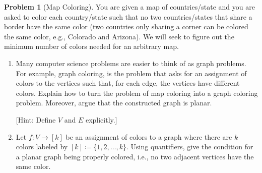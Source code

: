\documentclass{article}
\theoremstyle{plain}
\theoremstyle{definition}
\newtheorem{problem}{Problem}
\newcommand{\ra}{\rightarrow}
\begin{document}
\begin{problem}[Map Coloring]
    You are given a map of countries/state and you are asked to color each country/state such that no two countries/states that share a border have the same color (two countries only sharing a corner can be colored the same color, e.g., Colorado and Arizona). We will seek to figure out the minimum number of colors needed for an arbitrary map.
    
    \begin{enumerate}
        \item Many computer science problems are easier to think of as graph problems. For example, graph coloring, is the problem that asks for an assignment of colors to the vertices such that, for each edge, the vertices have different colors. Explain how to turn the problem of map coloring into a graph coloring problem. Moreover, argue that the constructed graph is planar.

        [Hint: Define \(V\) and \(E\) explicitly.]


        \item Let \(f: V \ra [k]\) be an assignment of colors to a graph where there are \(k\) colors labeled by \([k] \coloneq \{1, 2, \dotsc, k\}\). Using quantifiers, give the condition for a planar graph being properly colored, i.e., no two adjacent vertices have the same color.


\end{enumerate}
\end{problem}
\end{document}
